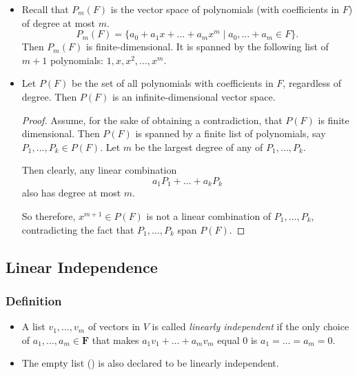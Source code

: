 \documentclass[11pt]{article}
\begin{document}
    \begin{itemize}
        \item Recall that \(P_m(F)\) is the vector space of polynomials (with coefficients in $F$) of degree at most $m$. \[P_m(F) = \{a_0 + a_1 x + \dots + a_m x^m \mid a_0, \dots + a_m \in F\}.\] Then \(P_m(F)\) is finite-dimensional. It is spanned by the following list of $m+1$ polynomials: \(1, x, x^2, \dots, x^m.\)
        \item Let \(P(F)\) be the set of all polynomials with coefficients in $F$, regardless of degree. Then \(P(F)\) is an infinite-dimensional vector space.
        \begin{proof}
            Assume, for the sake of obtaining a contradiction, that \(P(F)\) is finite dimensional. Then \(P(F)\) is spanned by a finite list of polynomials, say \(P_1, \dots , P_k \in P(F)\). Let $m$ be the largest degree of any of \(P_1, \dots, P_k.\) 

            Then clearly, any linear combination \[a_1 P_1 + \dots + a_k P_k\] also has degree at most $m$. 

            So therefore, \(x^{m+1} \in P(F)\) is not a linear combination of \(P_1, \dots, P_k\), contradicting the fact that \(P_1, \dots, P_k\) span \(P(F)\).
        \end{proof}
    \end{itemize}

    \pagebreak
    
    \subsection{Linear Independence}

    \subsubsection{Definition}
    \begin{itemize}
        \item A list \(v_1, \dots, v_m\) of vectors in $V$ is called \emph{linearly independent} if the only choice of \(a_1, \dots, a_m \in \textbf{F}\) that makes \(a_1 v_1 + \dots + a_m v_m\) equal 0 is \(a_1 = \dots = a_m = 0.\)
        \item The empty list () is also declared to be linearly independent.
    \end{itemize}
\end{document}
